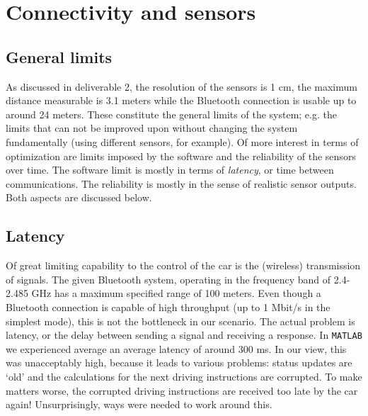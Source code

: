 \documentclass[11pt,titlepage]{report}
\begin{document}
\chapter{Connectivity and sensors}
\section{General limits}
As discussed in deliverable 2, the resolution of the sensors is 1 cm, the maximum distance measurable is 3.1 meters while the Bluetooth connection is usable up to around 24 meters. These constitute the general limits of the system; e.g. the limits that can not be improved upon without changing the system fundamentally (using different sensors, for example). Of more interest in terms of optimization are limits imposed by the software and the reliability of the sensors over time. The software limit is mostly in terms of \textit{latency}, or time between communications. The reliability is mostly in the sense of realistic sensor outputs. Both aspects are discussed below.

\section{Latency}
Of great limiting capability to the control of the car is the (wireless) transmission of signals. The given Bluetooth system, operating in the frequency band of 2.4-2.485 GHz has a maximum specified range of 100 meters.  Even though a Bluetooth connection is capable of high throughput (up to 1 Mbit/s in the simplest mode), this is not the bottleneck in our scenario. The actual problem is latency, or the delay between sending a signal and receiving a response. In \texttt{MATLAB} we experienced average an average latency of around 300 ms. In our view, this was unacceptably high, because it leads to various problems: status updates are `old' and the calculations for the next driving instructions are corrupted. To make matters worse, the corrupted driving instructions are received too late by the car again! Unsurprisingly, ways were needed to work around this.\\
\end{document}
